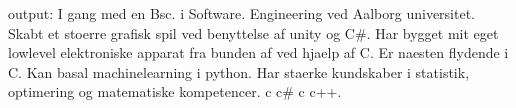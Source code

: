 output: I gang med en Bsc. i Software. Engineering ved Aalborg universitet.
Skabt et stoerre grafisk spil ved benyttelse af unity og C#.
Har bygget mit eget lowlevel elektroniske apparat fra bunden af ved hjaelp af C.
Er naesten flydende i C.
Kan basal machinelearning i python.
Har staerke kundskaber i statistik, optimering og matematiske kompetencer.
c
c# c c++.

